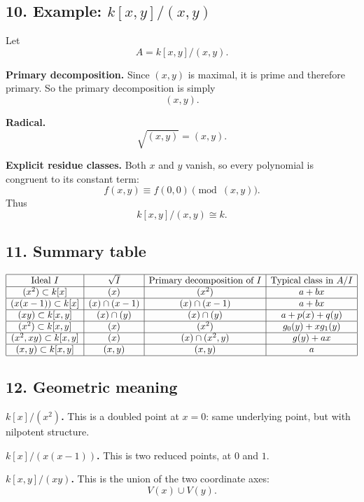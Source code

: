\documentclass[12pt,a4paper]{article}
\theoremstyle{notespace}
\begin{document}
\subsection*{10. Example: \(k[x,y]/(x,y)\)}

Let
\[
A=k[x,y]/(x,y).
\]

\textbf{Primary decomposition.}
Since \((x,y)\) is maximal, it is prime and therefore primary.
So the primary decomposition is simply
\[
(x,y).
\]

\textbf{Radical.}
\[
\sqrt{(x,y)}=(x,y).
\]

\textbf{Explicit residue classes.}
Both \(x\) and \(y\) vanish, so every polynomial is congruent to its constant term:
\[
f(x,y)\equiv f(0,0)\pmod{(x,y)}.
\]
Thus
\[
k[x,y]/(x,y)\cong k.
\]

\subsection*{11. Summary table}

\[
\begin{array}{|c|c|c|c|}
	\hline
	\text{Ideal }I & \sqrt I & \text{Primary decomposition of }I & \text{Typical class in }A/I \\
	\hline
	(x^2)\subset k[x] & (x) & (x^2) & a+bx \\
	\hline
	(x(x-1))\subset k[x] & (x)\cap(x-1) & (x)\cap(x-1) & a+bx \\
	\hline
	(xy)\subset k[x,y] & (x)\cap(y) & (x)\cap(y) & a+p(x)+q(y) \\
	\hline
	(x^2)\subset k[x,y] & (x) & (x^2) & g_0(y)+xg_1(y) \\
	\hline
	(x^2,xy)\subset k[x,y] & (x) & (x)\cap(x^2,y) & g(y)+ax \\
	\hline
	(x,y)\subset k[x,y] & (x,y) & (x,y) & a \\
	\hline
\end{array}
\]

\subsection*{12. Geometric meaning}

\textbf{\(k[x]/(x^2)\).}
This is a doubled point at \(x=0\): same underlying point, but with nilpotent structure.

\textbf{\(k[x]/(x(x-1))\).}
This is two reduced points, at \(0\) and \(1\).

\textbf{\(k[x,y]/(xy)\).}
This is the union of the two coordinate axes:
\[
V(x)\cup V(y).
\]
\end{document}
